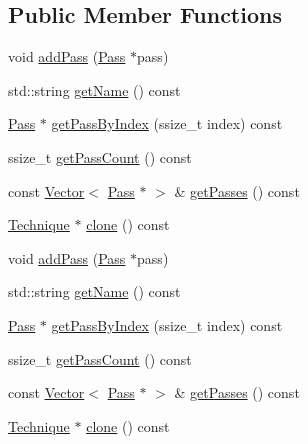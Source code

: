 \subsection*{Public Member Functions}
\begin{DoxyCompactItemize}
\item 
void \hyperlink{classTechnique_a6eba3e4ace1c907d900668bd0764e5cd}{add\+Pass} (\hyperlink{classPass}{Pass} $\ast$pass)
\item 
std\+::string \hyperlink{classTechnique_a910aded3e0c8f247af9d113b7fbd594c}{get\+Name} () const
\item 
\hyperlink{classPass}{Pass} $\ast$ \hyperlink{classTechnique_ada593b093eaf1e0b964f96789d412eec}{get\+Pass\+By\+Index} (ssize\+\_\+t index) const
\item 
ssize\+\_\+t \hyperlink{classTechnique_a6de439117a58b51d44729dafd25c9a2a}{get\+Pass\+Count} () const
\item 
const \hyperlink{classVector}{Vector}$<$ \hyperlink{classPass}{Pass} $\ast$ $>$ \& \hyperlink{classTechnique_a59663f422b3c710a0ffc510d7ae86a2b}{get\+Passes} () const
\item 
\hyperlink{classTechnique}{Technique} $\ast$ \hyperlink{classTechnique_a2519656e5d79427781ec358ac346bb10}{clone} () const
\item 
void \hyperlink{classTechnique_a6eba3e4ace1c907d900668bd0764e5cd}{add\+Pass} (\hyperlink{classPass}{Pass} $\ast$pass)
\item 
std\+::string \hyperlink{classTechnique_a910aded3e0c8f247af9d113b7fbd594c}{get\+Name} () const
\item 
\hyperlink{classPass}{Pass} $\ast$ \hyperlink{classTechnique_ab0b77a4dd6ba08b17c84aa089a556e0e}{get\+Pass\+By\+Index} (ssize\+\_\+t index) const
\item 
ssize\+\_\+t \hyperlink{classTechnique_a6de439117a58b51d44729dafd25c9a2a}{get\+Pass\+Count} () const
\item 
const \hyperlink{classVector}{Vector}$<$ \hyperlink{classPass}{Pass} $\ast$ $>$ \& \hyperlink{classTechnique_ab730df710cbc126b4bd6fa1b53c8380b}{get\+Passes} () const
\item 
\hyperlink{classTechnique}{Technique} $\ast$ \hyperlink{classTechnique_a725b9c83407cacf2c8b5a0554ded2368}{clone} () const
\end{DoxyCompactItemize}
